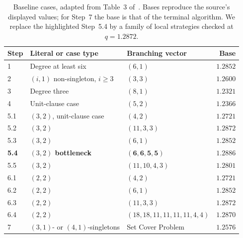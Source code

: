 \documentclass[10pt,twoside]{article}
\theoremstyle{definition}
\theoremstyle{remark}
\begin{document}
\begin{table}[!htbp]
\centering\small
\begin{tabularx}{\linewidth}{@{}lXlr@{}}
\toprule
Step & Literal or case type & Branching vector & Base \\
\midrule
1 & Degree at least six & $(6,1)$ & $1.2852$ \\
2 & $(i,1)$ non-singleton, $i\ge3$ & $(3,3)$ & $1.2600$ \\
3 & Degree three & $(8,1)$ & $1.2321$ \\
4 & Unit-clause case & $(5,2)$ & $1.2366$ \\
5.1 & $(3,2)$, unit-clause case & $(4,2)$ & $1.2721$ \\
5.2 & $(3,2)$ & $(11,3,3)$ & $1.2872$ \\
5.3 & $(3,2)$ & $(6,1)$ & $1.2852$ \\
\textbf{5.4} & \textbf{$(3,2)$ bottleneck} & $\mathbf{(6,6,5,5)}$ & $\mathbf{1.2886}$ \\
5.5 & $(3,2)$ & $(11,10,4,3)$ & $1.2801$ \\
6.1 & $(2,2)$ & $(4,2)$ & $1.2721$ \\
6.2 & $(2,2)$ & $(6,1)$ & $1.2852$ \\
6.3 & $(2,2)$ & $(11,3,3)$ & $1.2872$ \\
6.4 & $(2,2)$ & $(18,18,11,11,11,11,4,4)$ & $1.2870$ \\
7 & $(3,1)$- or $(4,1)$-singletons & Set Cover Problem & $1.2576$ \\
\bottomrule
\end{tabularx}
\caption{Baseline cases, adapted from Table~3 of~\cite{Xiao2022}.
Bases reproduce the source's displayed values; for Step~7 the base is
that of the terminal algorithm. We replace the highlighted Step~5.4 by
a family of local strategies checked at $q=1.2872$.}
\label{tab:global-vectors}
\end{table}
\end{document}

